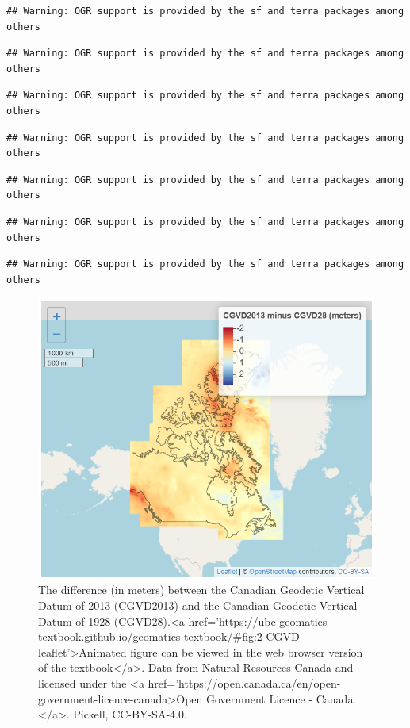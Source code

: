\documentclass[
]{book}
\begin{document}
\begin{verbatim}
## Warning: OGR support is provided by the sf and terra packages among others
\end{verbatim}

\begin{verbatim}
## Warning: OGR support is provided by the sf and terra packages among others
\end{verbatim}

\begin{verbatim}
## Warning: OGR support is provided by the sf and terra packages among others
\end{verbatim}

\begin{verbatim}
## Warning: OGR support is provided by the sf and terra packages among others
\end{verbatim}

\begin{verbatim}
## Warning: OGR support is provided by the sf and terra packages among others
\end{verbatim}

\begin{verbatim}
## Warning: OGR support is provided by the sf and terra packages among others
\end{verbatim}

\begin{verbatim}
## Warning: OGR support is provided by the sf and terra packages among others
\end{verbatim}

\begin{figure}
\includegraphics[width=0.75\linewidth]{images/02-CGVD-leaflet} \caption{The difference (in meters) between the Canadian Geodetic Vertical Datum of 2013 (CGVD2013) and the Canadian Geodetic Vertical Datum of 1928 (CGVD28).<a
  href='https://ubc-geomatics-textbook.github.io/geomatics-textbook/#fig:2-CGVD-leaflet'>Animated figure can be viewed in the web browser version of the textbook</a>. Data from Natural Resources Canada and licensed under the <a href='https://open.canada.ca/en/open-government-licence-canada>Open Government Licence - Canada </a>. Pickell, CC-BY-SA-4.0.}\label{fig:2-CGVD-leaflet}
\end{figure}
\end{document}
